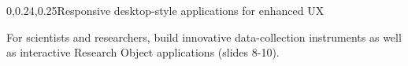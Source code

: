 \begin{frame}{}
{\begin{center}
\begin{minipage}{.9\textwidth}
{\begin{minipage}{\textwidth}
\begin{lightquadblockc}{0,0.24,0.25}{Responsive desktop-style applications for enhanced UX}
\begin{itemize}
\sqitem   {\lsep} \parbox[t]{17cm}{For scientists and researchers, 
build innovative data-collection instruments 
as well as interactive Research Object applications 
(slides 8-10).}\vspace{1.5em}
\end{itemize} 
\end{lightquadblockc}
\end{minipage}}

\end{minipage}
\end{center}
}

\end{frame}
